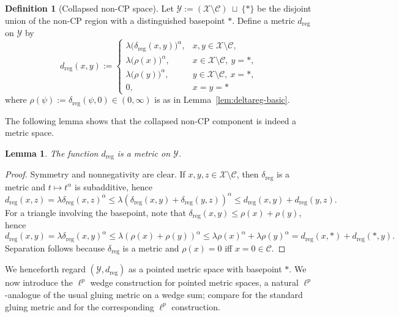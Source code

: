 \documentclass[11pt]{amsart}
\newtheorem{lemma}[theorem]{Lemma}
\theoremstyle{definition}
\newtheorem{definition}[theorem]{Definition}
\theoremstyle{remark}
\newcommand{\1}{\mathbbm{1}}
\begin{document}
\begin{definition}[Collapsed non-CP space]\label{def:bk-Y-space}
Let $\mathcal Y:=(\mathcal X\setminus\mathcal C)\ \sqcup\ \{\ast\}$
be the disjoint union of the non-CP region with a distinguished basepoint $\ast$.
Define a metric $d_{\mathrm{reg}}$ on $\mathcal Y$ by
\[
d_{\mathrm{reg}}(x,y):=
\begin{cases}
\lambda\bigl(\delta_{\mathrm{reg}}(x,y)\bigr)^\alpha, & x,y\in \mathcal X\setminus\mathcal C,\\[1mm]
\lambda\bigl(\rho(x)\bigr)^\alpha, & x\in \mathcal X\setminus\mathcal C,\ y=\ast,\\[1mm]
\lambda\bigl(\rho(y)\bigr)^\alpha, & y\in \mathcal X\setminus\mathcal C,\ x=\ast,\\[1mm]
0,& x=y=\ast
\end{cases}
\]
where $\rho(\psi):=\delta_{\mathrm{reg}}(\psi,0) \in (0,\infty)$ is as in Lemma~\ref{lem:deltareg-basic}.
\end{definition}
The following lemma shows that the collapsed non-CP component is indeed a metric space.
\begin{lemma}\label{lem:bk-dreg-metric}
The function $d_{\mathrm{reg}}$ is a metric on $\mathcal Y$.
\end{lemma}

\begin{proof}
Symmetry and nonnegativity are clear.
If $x,y,z\in\mathcal X\setminus\mathcal C$, then $\delta_{\mathrm{reg}}$ is a metric and $t\mapsto t^\alpha$ is subadditive, hence
\[
d_{\mathrm{reg}}(x,z)=\lambda\delta_{\mathrm{reg}}(x,z)^\alpha
\le \lambda(\delta_{\mathrm{reg}}(x,y)+\delta_{\mathrm{reg}}(y,z))^\alpha
\le d_{\mathrm{reg}}(x,y)+d_{\mathrm{reg}}(y,z).
\]
For a triangle involving the basepoint, note that $\delta_{\mathrm{reg}}(x,y)\le \rho(x)+\rho(y)$, hence
\[
d_{\mathrm{reg}}(x,y)=\lambda\delta_{\mathrm{reg}}(x,y)^\alpha
\le \lambda(\rho(x)+\rho(y))^\alpha
\le \lambda\rho(x)^\alpha+\lambda\rho(y)^\alpha
=d_{\mathrm{reg}}(x,\ast)+d_{\mathrm{reg}}(\ast,y).
\]
Separation follows because $\delta_{\mathrm{reg}}$ is a metric and $\rho(x)=0$ iff $x=0\in\mathcal C$.
\end{proof}

We henceforth regard $(\mathcal Y,d_{\mathrm{reg}})$ as a pointed metric space with basepoint $\ast$.  We now introduce the $\ell^p$ wedge construction for pointed metric spaces, a natural $\ell^p$-analogue of the usual gluing metric on a wedge sum; compare \cite[Definition~5.23 and Lemma~5.24]{BH} for the standard gluing metric and \cite[\S5.1 and Proposition~5.5]{CDT} for the corresponding $\ell^p$ construction.
\end{document}
